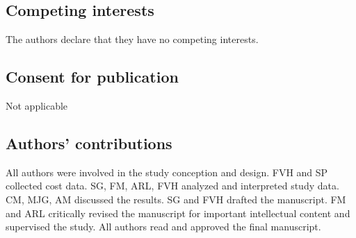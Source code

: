 \documentclass{bmcart}
\begin{document}
\subsection*{Competing interests}
The authors declare that they have no competing interests.

\subsection*{Consent for publication}%
Not applicable

\subsection*{Authors' contributions}
All authors were involved in the study conception and design. FVH and SP collected cost data. SG, FM, ARL, FVH  analyzed and interpreted study data. CM, MJG, AM discussed the results. SG and FVH drafted the manuscript. FM and ARL
critically revised the manuscript for important intellectual content and supervised the study. All authors read and approved the final manuscript.



\end{document}
